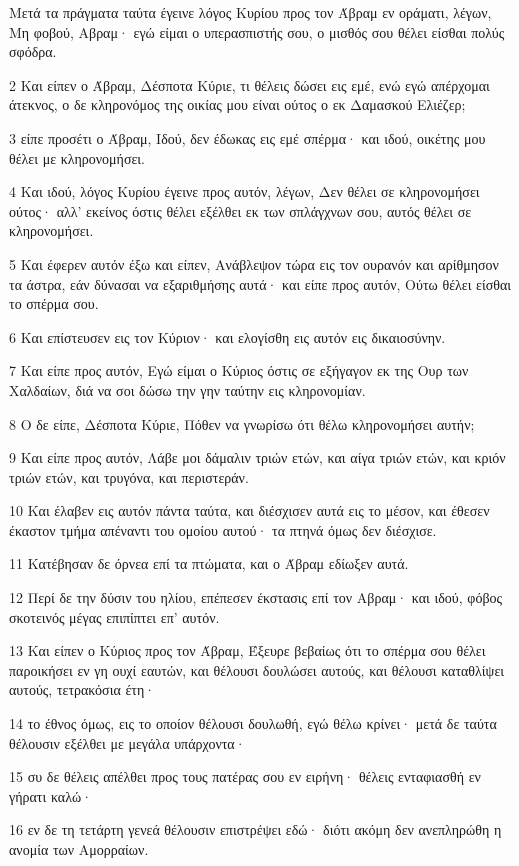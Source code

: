 \par Μετά τα πράγματα ταύτα έγεινε λόγος Κυρίου προς τον Άβραμ εν οράματι, λέγων, Μη φοβού, Αβραμ· εγώ είμαι ο υπερασπιστής σου, ο μισθός σου θέλει είσθαι πολύς σφόδρα.
\par 2 Και είπεν ο Άβραμ, Δέσποτα Κύριε, τι θέλεις δώσει εις εμέ, ενώ εγώ απέρχομαι άτεκνος, ο δε κληρονόμος της οικίας μου είναι ούτος ο εκ Δαμασκού Ελιέζερ;
\par 3 είπε προσέτι ο Άβραμ, Ιδού, δεν έδωκας εις εμέ σπέρμα· και ιδού, οικέτης μου θέλει με κληρονομήσει.
\par 4 Και ιδού, λόγος Κυρίου έγεινε προς αυτόν, λέγων, Δεν θέλει σε κληρονομήσει ούτος· αλλ' εκείνος όστις θέλει εξέλθει εκ των σπλάγχνων σου, αυτός θέλει σε κληρονομήσει.
\par 5 Και έφερεν αυτόν έξω και είπεν, Ανάβλεψον τώρα εις τον ουρανόν και αρίθμησον τα άστρα, εάν δύνασαι να εξαριθμήσης αυτά· και είπε προς αυτόν, Ούτω θέλει είσθαι το σπέρμα σου.
\par 6 Και επίστευσεν εις τον Κύριον· και ελογίσθη εις αυτόν εις δικαιοσύνην.
\par 7 Και είπε προς αυτόν, Εγώ είμαι ο Κύριος όστις σε εξήγαγον εκ της Ουρ των Χαλδαίων, διά να σοι δώσω την γην ταύτην εις κληρονομίαν.
\par 8 Ο δε είπε, Δέσποτα Κύριε, Πόθεν να γνωρίσω ότι θέλω κληρονομήσει αυτήν;
\par 9 Και είπε προς αυτόν, Λάβε μοι δάμαλιν τριών ετών, και αίγα τριών ετών, και κριόν τριών ετών, και τρυγόνα, και περιστεράν.
\par 10 Και έλαβεν εις αυτόν πάντα ταύτα, και διέσχισεν αυτά εις το μέσον, και έθεσεν έκαστον τμήμα απέναντι του ομοίου αυτού· τα πτηνά όμως δεν διέσχισε.
\par 11 Κατέβησαν δε όρνεα επί τα πτώματα, και ο Άβραμ εδίωξεν αυτά.
\par 12 Περί δε την δύσιν του ηλίου, επέπεσεν έκστασις επί τον Αβραμ· και ιδού, φόβος σκοτεινός μέγας επιπίπτει επ' αυτόν.
\par 13 Και είπεν ο Κύριος προς τον Άβραμ, Έξευρε βεβαίως ότι το σπέρμα σου θέλει παροικήσει εν γη ουχί εαυτών, και θέλουσι δουλώσει αυτούς, και θέλουσι καταθλίψει αυτούς, τετρακόσια έτη·
\par 14 το έθνος όμως, εις το οποίον θέλουσι δουλωθή, εγώ θέλω κρίνει· μετά δε ταύτα θέλουσιν εξέλθει με μεγάλα υπάρχοντα·
\par 15 συ δε θέλεις απέλθει προς τους πατέρας σου εν ειρήνη· θέλεις ενταφιασθή εν γήρατι καλώ·
\par 16 εν δε τη τετάρτη γενεά θέλουσιν επιστρέψει εδώ· διότι ακόμη δεν ανεπληρώθη η ανομία των Αμορραίων.
